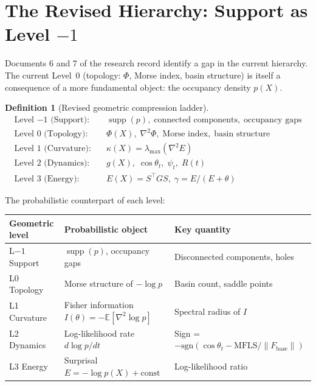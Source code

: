 \documentclass[11pt,a4paper]{article}
\theoremstyle{definition}
\newtheorem{definition}[theorem]{Definition}
\newcommand{\Fbase}{F_{\mathrm{base}}}
\begin{document}
\section{The Revised Hierarchy: Support as Level $-1$}
\label{sec:hierarchy_revised}

\noindent
Documents 6 and 7 of the research record identify a gap in the current hierarchy.
The current Level~0 (topology: $\Phi$, Morse index, basin structure) is itself a
consequence of a more fundamental object: the occupancy density $p(X)$.

\begin{definition}[Revised geometric compression ladder]
\begin{align*}
\text{Level~$-1$ (Support):}&\quad \operatorname{supp}(p),\;\text{connected components},\;\text{occupancy gaps}\\
\text{Level~0 (Topology):}&\quad \Phi(X),\;\nabla^2\Phi,\;\text{Morse index},\;\text{basin structure}\\
\text{Level~1 (Curvature):}&\quad \kappa(X) = \lambda_\mathrm{max}(\nabla^2 E)\\
\text{Level~2 (Dynamics):}&\quad g(X),\;\cos\theta_t,\;\psi_t,\;R(t)\\
\text{Level~3 (Energy):}&\quad E(X) = S^\top GS,\;\gamma = E/(E+\theta)
\end{align*}
\end{definition}

The probabilistic counterpart of each level:

\begin{center}
\renewcommand{\arraystretch}{1.3}
\begin{tabular}{lll}
\toprule
\textbf{Geometric level} & \textbf{Probabilistic object} & \textbf{Key quantity} \\
\midrule
L$-1$ Support & $\operatorname{supp}(p)$, occupancy gaps & Disconnected components, holes \\
L0 Topology & Morse structure of $-\log p$ & Basin count, saddle points \\
L1 Curvature & Fisher information $I(\theta) = -\mathbb{E}[\nabla^2\log p]$ & Spectral radius of $I$ \\
L2 Dynamics & Log-likelihood rate $d\log p/dt$ & Sign = $-\text{sgn}(\cos\theta_t - \text{MFLS}/\|\Fbase\|)$ \\
L3 Energy & Surprisal $E = -\log p(X) + \text{const}$ & Log-likelihood ratio \\
\bottomrule
\end{tabular}
\end{center}
\end{document}

